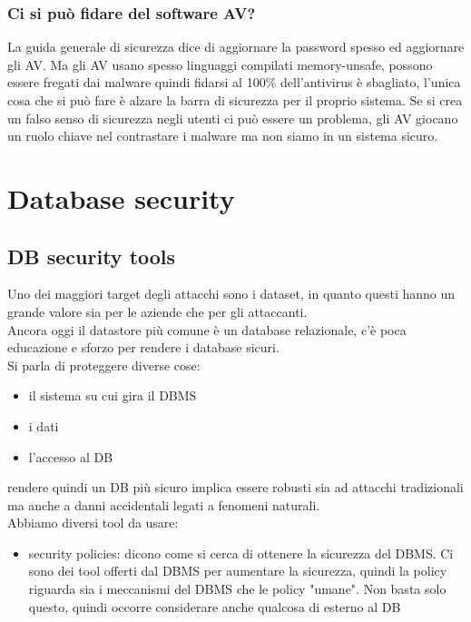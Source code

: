 \documentclass[12pt, oneside]{extbook} %
\begin{document}
\subsection{Ci si può fidare del software AV?}
La guida generale di sicurezza dice di aggiornare la password spesso ed aggiornare gli AV. Ma gli AV usano spesso linguaggi compilati memory-unsafe, possono essere fregati dai malware quindi fidarsi al 100\% dell'antivirus è sbagliato, l'unica cosa che si può fare è alzare la barra di sicurezza per il proprio sistema. Se si crea un falso senso di sicurezza negli utenti ci può essere un problema, gli AV giocano un ruolo chiave nel contrastare i malware ma non siamo in un sistema sicuro.

\chapter{Database security}

\section{DB security tools}
Uno dei maggiori target degli attacchi sono i dataset, in quanto questi hanno un grande valore sia per le aziende che per gli attaccanti.\\Ancora oggi il datastore più comune è un database relazionale, c'è poca educazione e sforzo per rendere i database sicuri.\\Si parla di proteggere diverse cose:
\begin{itemize}
	\item il sistema su cui gira il DBMS
	\item i dati
	\item l'accesso al DB
\end{itemize}
rendere quindi un DB più sicuro implica essere robusti sia ad attacchi tradizionali ma anche a danni accidentali legati a fenomeni naturali.\\Abbiamo diversi tool da usare:
\begin{itemize}
	\item security policies: dicono come si cerca di ottenere la sicurezza del DBMS. Ci sono dei tool offerti dal DBMS per aumentare la sicurezza, quindi la policy riguarda sia i meccanismi del DBMS che le policy "umane". Non basta solo questo, quindi occorre considerare anche qualcosa di esterno al DB
\end{itemize}
\end{document}
